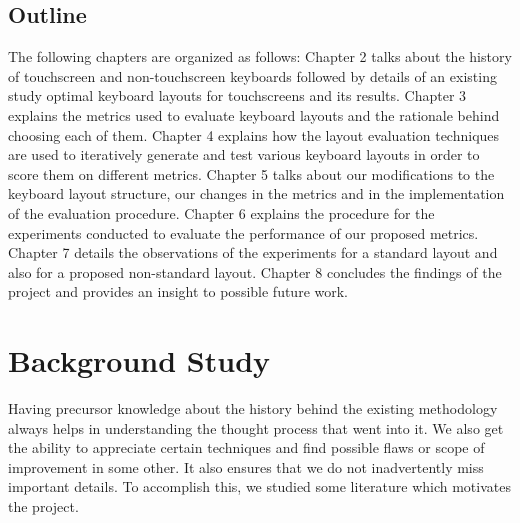 \documentclass[MTech]{iitmdiss}
\begin{document}
\section{Outline}
The following chapters are organized as follows: 
Chapter 2 talks about the history of touchscreen and non-touchscreen keyboards followed by details of an existing study optimal keyboard layouts for touchscreens and its results. Chapter 3 explains the metrics used to evaluate keyboard layouts and the rationale behind choosing each of them.
Chapter 4 explains how the layout evaluation techniques are used to iteratively generate and test various keyboard layouts in order to score them on different metrics.
Chapter 5 talks about our modifications to the keyboard layout structure, our changes in the metrics and in the implementation of the evaluation procedure.
Chapter 6 explains the procedure for the experiments conducted to evaluate the performance of our proposed metrics.
Chapter 7 details the observations of the experiments for a standard layout and also for a proposed non-standard layout.
Chapter 8 concludes the findings of the project and provides an insight to possible future work.

\chapter{Background Study}
Having precursor knowledge about the history behind the existing methodology always helps in understanding the thought process that went into it. We also get the ability to appreciate certain techniques and find possible flaws or scope of improvement in some other. It also ensures that we do not inadvertently miss important details. To accomplish this, we studied some literature which motivates the project.
 
\end{document}
